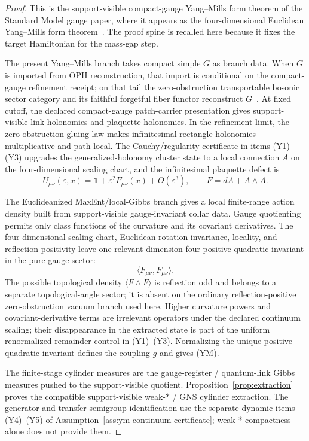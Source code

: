 \documentclass[11pt]{article}
\numberwithin{equation}{section}
\theoremstyle{remark}
\begin{document}
\begin{proof}
This is the support-visible compact-gauge Yang--Mills form theorem of the Standard Model gauge
paper, where it appears as the four-dimensional Euclidean Yang--Mills form theorem~\cite{oph2}. The proof
spine is recalled here because it fixes the target Hamiltonian for the mass-gap step.

The present Yang--Mills branch takes compact simple \(G\) as branch data. When \(G\) is imported
from OPH reconstruction, that import is conditional on the compact-gauge refinement receipt; on
that tail the zero-obstruction transportable bosonic sector category and its faithful forgetful
fiber functor reconstruct \(G\)~\cite{oph2}. At fixed cutoff, the declared compact-gauge patch-carrier presentation gives
support-visible link holonomies and plaquette holonomies. In the refinement limit, the
zero-obstruction gluing law makes infinitesimal rectangle holonomies multiplicative and
path-local. The Cauchy/regularity certificate in items (Y1)--(Y3) upgrades the
generalized-holonomy cluster state to a local connection \(A\) on the four-dimensional scaling
chart, and
the infinitesimal plaquette defect is
\[
U_{\mu\nu}(\varepsilon,x)
=
\mathbf 1+\varepsilon^2F_{\mu\nu}(x)+O(\varepsilon^3),
\qquad
F=dA+A\wedge A.
\]

The Euclideanized MaxEnt/local-Gibbs branch gives a local finite-range action density built from
support-visible gauge-invariant collar data. Gauge quotienting permits only class functions of
the curvature and its covariant derivatives. The four-dimensional scaling chart, Euclidean
rotation invariance, locality, and reflection positivity leave one relevant dimension-four
positive quadratic invariant in the pure gauge sector:
\[
\langle F_{\mu\nu},F_{\mu\nu}\rangle.
\]
The possible topological density \(\langle F\wedge F\rangle\) is reflection odd and belongs to a
separate topological-angle sector; it is absent on the ordinary reflection-positive
zero-obstruction vacuum branch used here. Higher curvature powers and covariant-derivative terms
are irrelevant operators under the declared continuum scaling; their disappearance in the
extracted state is part of the uniform renormalized remainder control in (Y1)--(Y3). Normalizing
the unique positive quadratic invariant defines the coupling \(g\) and gives (YM).

The finite-stage cylinder measures are the gauge-register / quantum-link Gibbs measures pushed to
the support-visible quotient. Proposition~\ref{prop:extraction} proves the compatible
support-visible weak-\(*\) / GNS cylinder extraction. The generator and transfer-semigroup
identification use the separate dynamic items (Y4)--(Y5) of
Assumption~\ref{ass:ym-continuum-certificate}; weak-* compactness alone does not provide them.
\end{proof}
\end{document}
